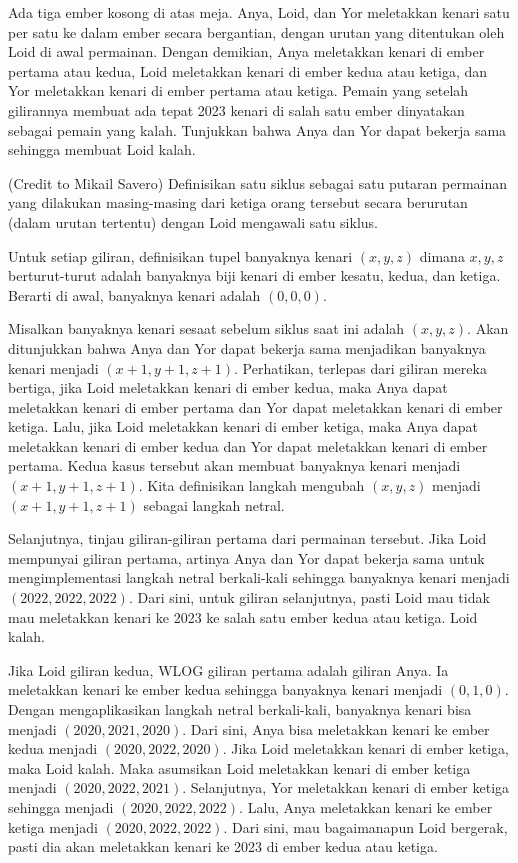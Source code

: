 \documentclass[12pt]{scrartcl}
\begin{document}
\begin{soaljawab}
Ada tiga ember kosong di atas meja. Anya, Loid, dan Yor meletakkan kenari satu per satu ke dalam ember secara bergantian, dengan urutan yang ditentukan oleh Loid di awal permainan. Dengan demikian, Anya meletakkan kenari di ember pertama atau kedua, Loid meletakkan kenari di ember kedua atau ketiga, dan Yor meletakkan kenari di ember pertama atau ketiga. Pemain yang setelah gilirannya membuat ada tepat 2023 kenari di salah satu ember dinyatakan sebagai pemain yang kalah. Tunjukkan bahwa Anya dan Yor dapat bekerja sama sehingga membuat Loid kalah.
    \begin{solusi}
        (Credit to Mikail Savero)
        Definisikan satu siklus sebagai satu putaran permainan yang dilakukan masing-masing dari ketiga orang tersebut secara berurutan (dalam urutan tertentu) dengan Loid mengawali satu siklus.

        Untuk setiap giliran, definisikan tupel banyaknya kenari $(x,y,z)$ dimana $x,y,z$ berturut-turut adalah banyaknya biji kenari di ember kesatu, kedua, dan ketiga. Berarti di awal, banyaknya kenari adalah $(0,0,0)$. 

        Misalkan banyaknya kenari sesaat sebelum siklus saat ini adalah $(x,y,z)$. Akan ditunjukkan bahwa Anya dan Yor dapat bekerja sama menjadikan banyaknya kenari menjadi $(x+1,y+1,z+1)$. Perhatikan, terlepas dari giliran mereka bertiga, jika Loid meletakkan kenari di ember kedua, maka Anya dapat meletakkan kenari di ember pertama dan Yor dapat meletakkan kenari di ember ketiga. Lalu, jika Loid meletakkan kenari di ember ketiga, maka Anya dapat meletakkan kenari di ember kedua dan Yor dapat meletakkan kenari di ember pertama. Kedua kasus tersebut akan membuat banyaknya kenari menjadi $(x+1, y+1, z+1)$. Kita definisikan langkah mengubah $(x,y,z)$ menjadi $(x+1,y+1,z+1)$ sebagai langkah netral.

        Selanjutnya, tinjau giliran-giliran pertama dari permainan tersebut. Jika Loid mempunyai giliran pertama, artinya Anya dan Yor dapat bekerja sama untuk mengimplementasi langkah netral berkali-kali sehingga banyaknya kenari menjadi $(2022,2022,2022)$. Dari sini, untuk giliran selanjutnya, pasti Loid mau tidak mau meletakkan kenari ke 2023 ke salah satu ember kedua atau ketiga. Loid kalah.

        Jika Loid giliran kedua, WLOG giliran pertama adalah giliran Anya. Ia meletakkan kenari ke ember kedua sehingga banyaknya kenari menjadi $(0,1,0)$. Dengan mengaplikasikan langkah netral berkali-kali, banyaknya kenari bisa menjadi $(2020,2021,2020)$. Dari sini, Anya bisa meletakkan kenari ke ember kedua menjadi $(2020,2022,2020)$. Jika Loid meletakkan kenari di ember ketiga, maka Loid kalah. Maka asumsikan Loid meletakkan kenari di ember ketiga menjadi $(2020,2022,2021)$. Selanjutnya, Yor meletakkan kenari di ember ketiga sehingga menjadi $(2020,2022,2022)$. Lalu, Anya meletakkan kenari ke ember ketiga menjadi $(2020,2022,2022)$. Dari sini, mau bagaimanapun Loid bergerak, pasti dia akan meletakkan kenari ke 2023 di ember kedua atau ketiga.


\end{solusi}
\end{soaljawab}
\end{document}
